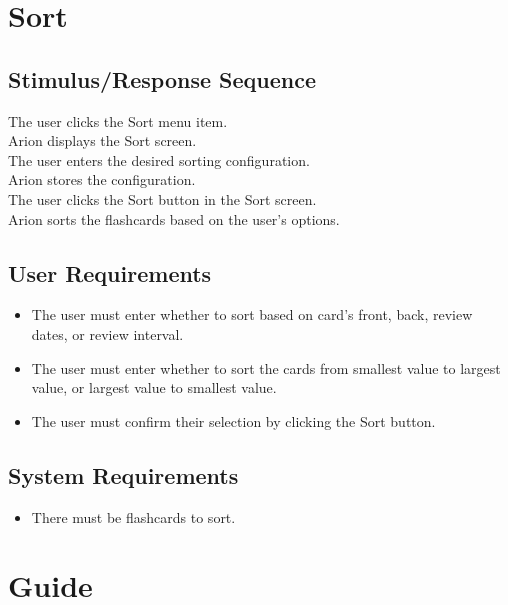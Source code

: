 \documentclass{scrreprt}
\newcommand{\smallspace}{\vspace{0.5cm}}
\begin{document}
\section{Sort}
    \subsection*{Stimulus/Response Sequence}
        \begin{flushleft}
             The user clicks the Sort menu item. \\
             Arion displays the Sort screen. \\
            \smallspace
             The user enters the desired sorting configuration. \\
             Arion stores the configuration. \\
            \smallspace
             The user clicks the Sort button in the Sort screen. \\
             Arion sorts the flashcards based on the user's options. \\
        \end{flushleft}
    \subsection*{User Requirements}
        \begin{itemize}
            \item The user must enter whether to sort based on card's front, back, review dates, or review interval.
            \item The user must enter whether to sort the cards from smallest value to largest value, or largest value to smallest value.
            \item The user must confirm their selection by clicking the Sort button.
        \end{itemize} 

    \subsection*{System Requirements}
    \begin{itemize}
        \item There must be flashcards to sort.
    \end{itemize}


\section{Guide}
\end{document}
